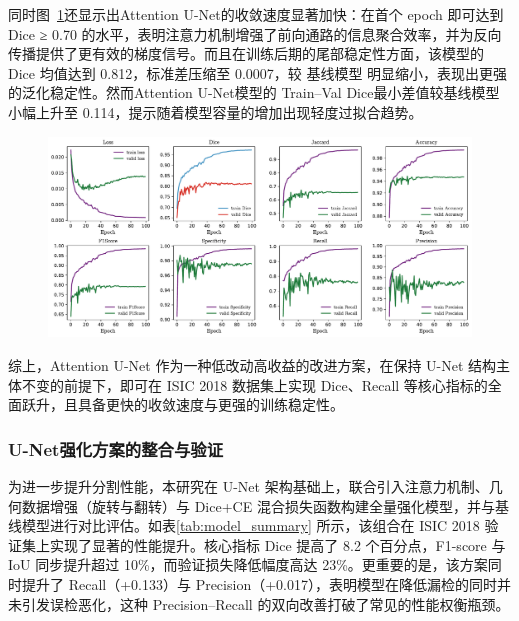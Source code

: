 同时图~\ref{fig:attunet}还显示出Attention U-Net的收敛速度显著加快：在首个 epoch 即可达到 Dice ≥ 0.70 的水平，表明注意力机制增强了前向通路的信息聚合效率，并为反向传播提供了更有效的梯度信号。而且在训练后期的尾部稳定性方面，该模型的 Dice 均值达到 0.812，标准差压缩至 0.0007，较 基线模型 明显缩小，表现出更强的泛化稳定性。然而Attention U-Net模型的 Train–Val Dice最小差值较基线模型小幅上升至 0.114，提示随着模型容量的增加出现轻度过拟合趋势。

\begin{figure}
    \centering
    \includegraphics[width=\textwidth]{fig/attunet_metrics.pdf}
    \caption{}
    \label{fig:attunet}
\end{figure}

综上，Attention U-Net 作为一种低改动高收益的改进方案，在保持 U-Net 结构主体不变的前提下，即可在 ISIC 2018 数据集上实现 Dice、Recall 等核心指标的全面跃升，且具备更快的收敛速度与更强的训练稳定性。

\subsubsection{U-Net强化方案的整合与验证}

为进一步提升分割性能，本研究在 U-Net 架构基础上，联合引入注意力机制、几何数据增强（旋转与翻转）与 Dice+CE 混合损失函数构建全量强化模型，并与基线模型进行对比评估。如表\~\ref{tab:model_summary} 所示，该组合在 ISIC 2018 验证集上实现了显著的性能提升。核心指标 Dice 提高了 8.2 个百分点，F1-score 与 IoU 同步提升超过 10\%，而验证损失降低幅度高达 23\%。更重要的是，该方案同时提升了 Recall（+0.133）与 Precision（+0.017），表明模型在降低漏检的同时并未引发误检恶化，这种 Precision–Recall 的双向改善打破了常见的性能权衡瓶颈。

